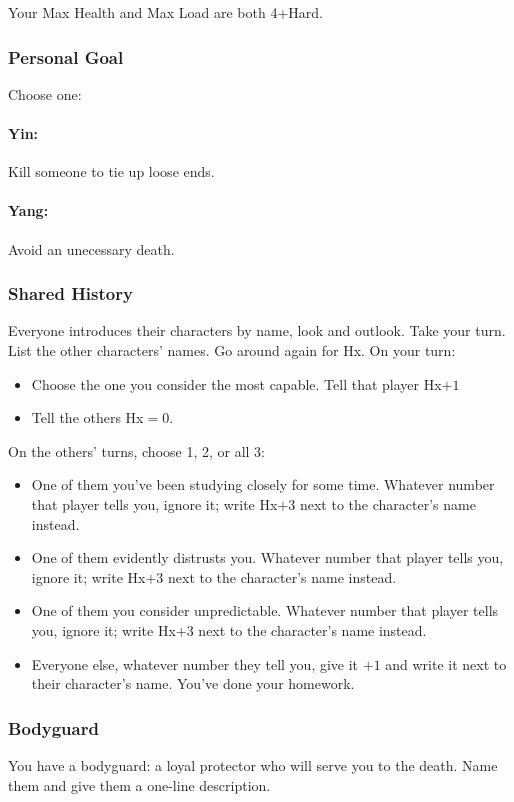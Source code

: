Your Max Health and Max Load are both 4+Hard.

\subsubsection{Personal Goal}
Choose one:
\paragraph{Yin:} Kill someone to tie up loose ends.
\paragraph{Yang:} Avoid an unecessary death.

\subsubsection{Shared History}
Everyone introduces their characters by name, look and outlook. Take
your turn. List the other characters' names. Go around again for
Hx. On your turn:
\begin{itemize} %
\item Choose the one you consider the most capable. Tell that player Hx$+1$
\item Tell the others Hx${=}0$.
\end{itemize}
On the others’ turns, choose 1, 2, or all 3:
\begin{itemize} %
\item One of them you've been studying closely for some time. Whatever
  number that player tells you, ignore it; write Hx$+3$ next to the
  character’s name instead.
\item One of them evidently distrusts you. Whatever number that player
  tells you, ignore it; write Hx$+3$ next to the character’s name
  instead.
\item One of them you consider unpredictable. Whatever number that
  player tells you, ignore it; write Hx$+3$ next to the character’s name
  instead.
\item Everyone else, whatever number they tell you, give it $+1$ and
  write it next to their character’s name. You've done your homework.
\end{itemize}

\subsubsection{Bodyguard}
You have a bodyguard: a loyal protector who will serve you to the death. Name them and give them a one-line description.

